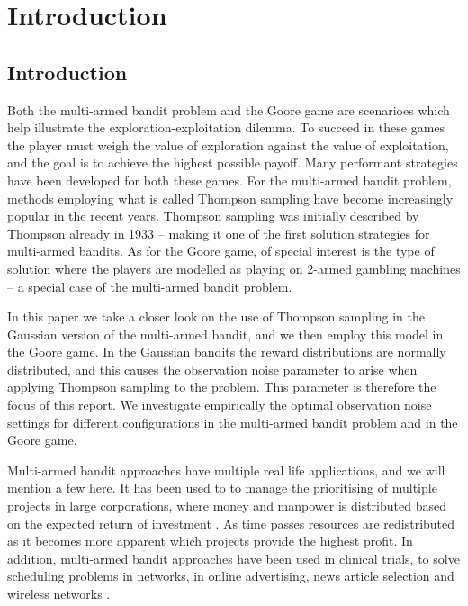 \chapter{Introduction}
\label{ch:introduction}

\section{Introduction}
Both the multi-armed bandit problem and the Goore game are scenarioes which help illustrate the exploration-exploitation dilemma.
To succeed in these games the player must weigh the value of exploration against the value of exploitation, and the goal is to achieve the highest possible payoff.
Many performant strategies have been developed for both these games.
For the multi-armed bandit problem, methods employing what is called Thompson sampling have become increasingly popular in the recent years.
Thompson sampling was initially described by Thompson already in 1933 -- making it one of the first solution strategies for multi-armed bandits.
As for the Goore game, of special interest is the type of solution where the players are modelled as playing on 2-armed gambling machines -- a special case of the multi-armed bandit problem.

In this paper we take a closer look on the use of Thompson sampling in the Gaussian version of the multi-armed bandit, and we then employ this model in the Goore game.
In the Gaussian bandits the reward distributions are normally distributed, and this causes the observation noise parameter \ob{} to arise when applying Thompson sampling to the problem.
This parameter is therefore the focus of this report.
We investigate empirically the optimal observation noise settings for different configurations in the multi-armed bandit problem and in the Goore game.

Multi-armed bandit approaches have multiple real life applications, and we will mention a few here.
It has been used to to manage the prioritising of multiple projects in large corporations, where money and manpower is distributed based on the expected return of investment \cite{Glimsdal12}.
As time passes resources are redistributed as it becomes more apparent which projects provide the highest profit.
In addition, multi-armed bandit approaches have been used in clinical trials, to solve scheduling problems in networks, in online advertising, news article selection and wireless networks \cite{Granmo07, Glimsdal12}.


